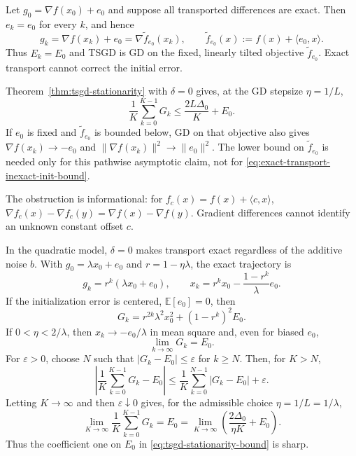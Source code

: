Let $g_0=\nabla f(x_0)+e_0$ and suppose all transported differences
are exact. Then $e_k=e_0$ for every $k$, and hence
\[
g_k=\nabla f(x_k)+e_0
=\nabla\widetilde f_{e_0}(x_k),\qquad
\widetilde f_{e_0}(x):=f(x)+\langle e_0,x\rangle.
\]
Thus $E_k=E_0$ and TSGD is GD on the fixed, linearly tilted
objective $\widetilde f_{e_0}$. Exact transport cannot correct the
initial error.

Theorem~\ref{thm:tsgd-stationarity} with $\delta=0$ gives, at the
GD stepsize $\eta=1/L$,
\begin{equation}
\label{eq:exact-transport-inexact-init-bound}
\frac1K\sum_{k=0}^{K-1}G_k
\leq\frac{2L\Delta_0}{K}+E_0.
\end{equation}
If $e_0$ is fixed and $\widetilde f_{e_0}$ is bounded below,
GD on that objective also gives
$\nabla f(x_k)\to-e_0$ and
$\|\nabla f(x_k)\|^2\to\|e_0\|^2$.
The lower bound on $\widetilde f_{e_0}$ is needed only for this
pathwise asymptotic claim, not for \eqref{eq:exact-transport-inexact-init-bound}.

The obstruction is informational: for
$f_c(x)=f(x)+\langle c,x\rangle$,
$\nabla f_c(x)-\nabla f_c(y)=\nabla f(x)-\nabla f(y)$.
Gradient differences cannot identify an unknown constant offset $c$.

In the quadratic model, $\delta=0$ makes transport exact regardless
of the additive noise $b$. With $g_0=\lambda x_0+e_0$ and
$r=1-\eta\lambda$, the exact trajectory is
\begin{equation}
\label{eq:quadratic-tilted-trajectory}
g_k=r^k(\lambda x_0+e_0),\qquad
x_k=r^k x_0-\frac{1-r^k}{\lambda}e_0.
\end{equation}
If the initialization error is centered, $\mathbb E[e_0]=0$, then
\begin{equation}
\label{eq:quadratic-centered-init-stationarity}
G_k=r^{2k}\lambda^2x_0^2+(1-r^k)^2E_0.
\end{equation}
If $0<\eta<2/\lambda$, then $x_k\to-e_0/\lambda$ in mean
square and, even for biased $e_0$,
\begin{equation}
\label{eq:quadratic-init-residual}
\lim_{k\to\infty}G_k=E_0.
\end{equation}
For $\varepsilon>0$, choose $N$ such that
$|G_k-E_0|\leq\varepsilon$ for $k\geq N$. Then, for $K>N$,
\[
\left|\frac1K\sum_{k=0}^{K-1}G_k-E_0\right|
\leq\frac1K\sum_{k=0}^{N-1}|G_k-E_0|+\varepsilon.
\]
Letting $K\to\infty$ and then $\varepsilon\downarrow0$ gives,
for the admissible choice $\eta=1/L=1/\lambda$,
\[
\lim_{K\to\infty}\frac1K\sum_{k=0}^{K-1}G_k
=E_0
=\lim_{K\to\infty}
\left(\frac{2\Delta_0}{\eta K}+E_0\right).
\]
Thus the coefficient one on $E_0$ in
\eqref{eq:tsgd-stationarity-bound} is sharp.

